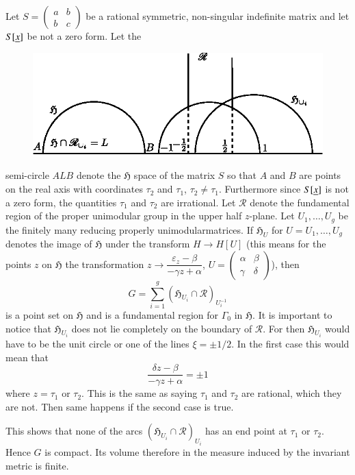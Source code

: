 Let $S=\left(\begin{smallmatrix} a & b\\ b &
  c\end{smallmatrix}\right)$ be a rational symmetric, non-singular
  indefinite matrix and let $S[\underline{x}]$ be not a zero form. Let the 
\begin{figure}[H]
\centering
\includegraphics{fig5.eps}
\end{figure}
semi-circle $ALB$ denote the $\mathfrak{H}$ space of the matrix $S$ so
that $A$ and $B$ are points on the real axis with coordinates
$\tau_{2}$ and $\tau_{1}$, $\tau_{2}\neq \tau_{1}$. Furthermore since
$S[\underline{x}]$ is not a zero form, the quantities $\tau_{1}$ and
$\tau_{2}$ are irrational. Let $\mathscr{R}$ denote the fundamental
region of the proper unimodular group in the upper half $z$-plane. Let
$U_{1},\ldots,U_{g}$ be the finitely many reducing properly
unimodular\pageoriginale matrices. If $\mathfrak{H}_{U}$ for
$U=U_{1},\ldots,U_{g}$ denotes the image of $\mathfrak{H}$ under the
transform $H\to H[U]$ (this means for the points $z$ on $\mathfrak{H}$
the transformation $z\to \dfrac{\varepsilon_{z}-\beta}{-\gamma
  z+\alpha}$, $U=\left(\begin{smallmatrix} \alpha & \beta\\ \gamma &
  \delta
\end{smallmatrix}\right)$), then
$$
G=\sum^{g}_{i=1}(\mathfrak{H}_{U_{i}}\cap \mathscr{R})_{U_{i}^{-1}}
$$
is a point set on $\mathfrak{H}$ and is a fundamental region for
$\Gamma_{0}$ in $\mathfrak{H}$. It is important to notice that
$\mathfrak{H}_{U_{i}}$ does not lie completely on the boundary of
$\mathscr{R}$. For then $\mathfrak{H}_{U_{i}}$ would have to be the
unit circle or one of the lines $\xi=\pm 1/2$. In the first case this
would mean that
$$
\frac{\delta z-\beta}{-\gamma z+\alpha}=\pm 1
$$
where $z=\tau_{1}$ or $\tau_{2}$. This is the same as saying
$\tau_{1}$ and $\tau_{2}$ are rational, which they are not. Then same
happens if the second case is true.

This shows that none of the arcs $(\mathfrak{H}_{U_{i}}\cap
\mathscr{R})_{U_{i}}$ has an end point at $\tau_{1}$ or
$\tau_{2}$. Hence $G$ is compact. Its volume therefore in the measure
induced by the invariant metric is finite.


